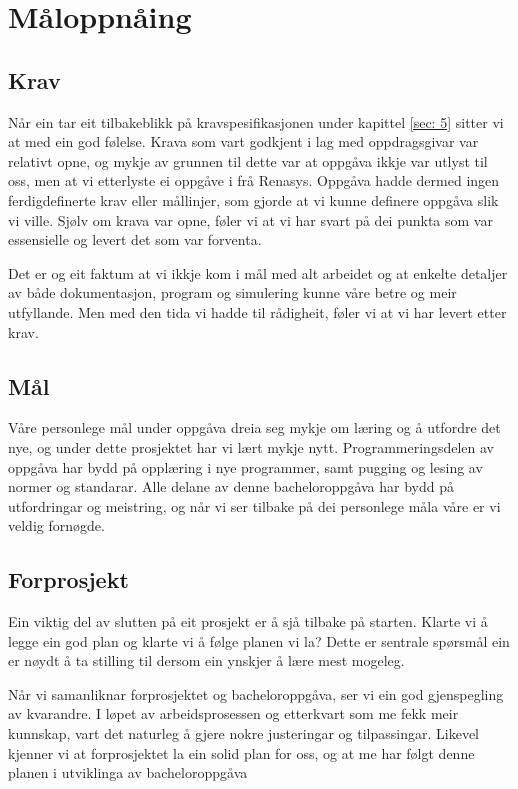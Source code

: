 \section{Måloppnåing}
\thispagestyle{fancy}

\subsection{Krav}
Når ein tar eit tilbakeblikk på kravspesifikasjonen under kapittel \ref{sec: 5} sitter vi at med ein god følelse.
Krava som vart godkjent i lag med oppdragsgivar var relativt opne, og 
mykje av grunnen til dette var at oppgåva ikkje var utlyst til oss, men at vi etterlyste ei oppgåve i frå \gls{Renasys}.
Oppgåva hadde dermed ingen ferdigdefinerte krav eller mållinjer, som gjorde at vi kunne definere oppgåva slik vi ville.
Sjølv om krava var opne, føler vi at vi har svart på dei punkta som var essensielle og levert det som var forventa.

Det er og eit faktum at vi ikkje kom i mål med alt arbeidet og at enkelte detaljer av både dokumentasjon, program og simulering
kunne våre betre og meir utfyllande. Men med den tida vi hadde til rådigheit, føler vi at vi har levert etter krav.

\subsection{Mål}
Våre personlege mål under oppgåva dreia seg mykje om læring og å utfordre det nye, og under dette prosjektet har vi lært mykje nytt. 
Programmeringsdelen av oppgåva har bydd på opplæring i nye programmer, samt pugging og lesing av normer og standarar.
Alle delane av denne bacheloroppgåva har bydd på utfordringar og meistring, og når vi ser tilbake på dei personlege måla våre er vi veldig fornøgde.

\subsection{Forprosjekt}
Ein viktig del av slutten på eit prosjekt er å sjå tilbake på starten.
Klarte vi å legge ein god plan og klarte vi å følge planen vi la?
Dette er sentrale spørsmål ein er nøydt å ta stilling til dersom ein ynskjer å lære mest mogeleg.

Når vi samanliknar forprosjektet og bacheloroppgåva, ser vi ein god gjenspegling av kvarandre. 
I løpet av arbeidsprosessen og etterkvart som me fekk meir kunnskap, vart det naturleg å gjere nokre justeringar og tilpassingar. 
Likevel kjenner vi at forprosjektet la ein solid plan for oss, og at me har følgt denne planen i utviklinga av bacheloroppgåva



\newpage